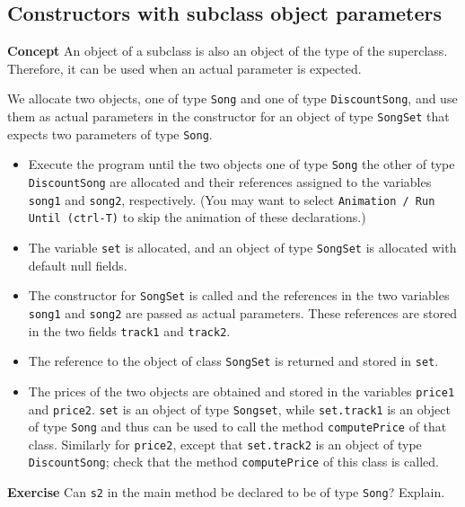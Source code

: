\subsection{Constructors with subclass object parameters}\label{con.08}

\textbf{Concept} An object of a subclass is also an object of the type of the 
superclass. Therefore, it can be used when an actual parameter is expected.


We allocate two objects, one of type \texttt{Song} and 
one of type \texttt{DiscountSong}, and use them as actual parameters in 
the constructor for an object of type \texttt{SongSet} that expects two 
parameters of type \texttt{Song}.
\begin{itemize}
\item Execute the program until the two objects one of type \texttt{Song} 
the other of type \texttt{DiscountSong} are 
allocated and their references assigned to the variables \texttt{song1} and \texttt{song2},
respectively.
(You may want to select \texttt{Animation / Run Until (ctrl-T)} to skip the 
animation of these declarations.)
\item The variable \texttt{set} is allocated, and an object of type 
\texttt{SongSet} is allocated with default null fields.
\item The constructor for \texttt{SongSet} is called and the references in the two variables
\texttt{song1} and \texttt{song2} are passed as actual parameters. These references 
are stored in the two fields \texttt{track1} and \texttt{track2}.
\item The reference to the object of class \texttt{SongSet} 
is returned and stored in \texttt{set}. 
\item The prices of the two objects are obtained and stored in the variables
\texttt{price1} and \texttt{price2}. \texttt{set} is an object 
of type \texttt{Songset}, while \texttt{set.track1} is an object of type 
\texttt{Song} and thus can be used to call the method 
\texttt{computePrice} of that class. Similarly for \texttt{price2},
except that \texttt{set.track2} is an object of type 
\texttt{DiscountSong}; check that the method \texttt{computePrice} of this
class is called.
\end{itemize}

\textbf{Exercise}  Can \texttt{s2} in the main method be declared to be of type
\texttt{Song}? Explain.

